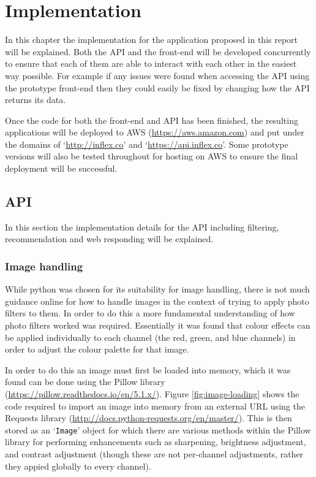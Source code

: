\documentclass[a4paper,12pt]{report}
\begin{document}
\chapter{Implementation} \label{cha:implement}
  In this chapter the implementation for the application proposed in this report will be explained. Both the API and the front-end will be developed concurrently to ensure that each of them are able to interact with each other in the easiest way possible. For example if any issues were found when accessing the API using the prototype front-end then they could easily be fixed by changing how the API returns its data.

  Once the code for both the front-end and API has been finished, the resulting applications will be deployed to AWS (\url{https://aws.amazon.com}) and put under the domains of ‘\url{http://inflex.co}’ and ‘\url{https://api.inflex.co}’. Some prototype versions will also be tested throughout for hosting on AWS to ensure the final deployment will be successful.

  \newpage
  \section{API}
    In this section the implementation details for the API including filtering, recommendation and web responding will be explained.

    \subsection{Image handling} \label{sec:numpy} \label{sec:pillow}
      While python was chosen for its suitability for image handling, there is not much guidance online for how to handle images in the context of trying to apply photo filters to them. In order to do this a more fundamental understanding of how photo filters worked was required. Essentially it was found that colour effects can be applied individually to each channel (the red, green, and blue channels) in order to adjust the colour palette for that image.

      In order to do this an image must first be loaded into memory, which it was found can be done using the Pillow library (\url{https://pillow.readthedocs.io/en/5.1.x/}). Figure \ref{fig:image-loading} shows the code required to import an image into memory from an external URL using the Requests library (\url{http://docs.python-requests.org/en/master/}). This is then stored as an ‘\texttt{Image}’ object for which there are various methods within the Pillow library for performing enhancements such as sharpening, brightness adjustment, and contrast adjustment (though these are not per-channel adjustments, rather they appied globally to every channel).
\end{document}
